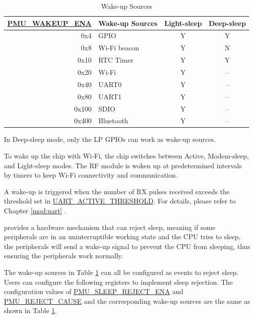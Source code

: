 \documentclass[main\_\_EN.tex]{subfiles}
\begin{document}
\begin{table}[H]
    \centering
    \caption{Wake-up Sources}
    \label{tab:lowpowm-wakeup-source}
    \begin{threeparttable}
    \begin{tabular}{| r | l | c | c |}
    \hline
    \rowcolor{lightgray}
    \textbf{\hyperref[fielddesc:PMUWAKEUPENA]{PMU\_WAKEUP\_ENA}} & \textbf{Wake-up Sources} &  \textbf{Light-sleep} & \textbf{Deep-sleep}  \\\hline
    0x4 & GPIO\tnote{1} & Y & Y \\\hline
    0x8 & Wi-Fi beacon  & Y & N \\\hline
    0x10 & RTC Timer  & Y & Y \\\hline
    0x20 & Wi-Fi\tnote{2} & Y & – \\\hline
    0x40 & UART0\tnote{3} & Y & – \\\hline
    0x80 & UART1\tnote{3} & Y & – \\\hline
    0x100 & SDIO & Y & – \\\hline
    0x400 & Bluetooth & Y & – \\\hline
    \end{tabular}

\begin{tablenotes}
    \item[1] In Deep-sleep mode, only the LP GPIOs can work as wake-up sources.
    \item[2] To wake up the chip with Wi-Fi, the chip switches between Active, Modem-sleep, and Light-sleep modes. The RF module is woken up at predetermined intervals by timers to keep Wi-Fi connectivity and communication.
    \item[3] A wake-up is triggered when the number of RX pulses received exceeds the threshold set in \hyperref[fielddesc:UARTACTIVETHRESHOLD]{UART\_ACTIVE\_THRESHOLD}. For details, please refer to Chapter \ref{mod:uart} \textit{}.
\end{tablenotes}
\end{threeparttable}
\end{table}

\chipname{} provides a hardware mechanism that can reject sleep, meaning if some peripherals are in an uninterruptible working state and the CPU tries to sleep, the peripherals will send a wake-up signal to prevent the CPU from sleeping, thus ensuring the peripherals work normally.

The wake-up sources in Table \ref{tab:lowpowm-wakeup-source} can all be configured as events to reject sleep. Users can configure the following registers to implement sleep rejection. The configuration values of \hyperref[fielddesc:PMUSLEEPREJECTENA]{PMU\_SLEEP\_REJECT\_ENA} and \hyperref[fielddesc:PMUREJECTCAUSE]{PMU\_REJECT\_CAUSE} and the corresponding wake-up sources are the same as shown in Table \ref{tab:lowpowm-wakeup-source}.
\end{document}
